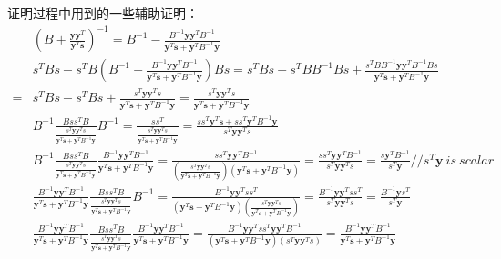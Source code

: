 证明过程中用到的一些辅助证明：
\begin{displaymath}
\begin{split}
&(B + \frac{\mathbf{y}\mathbf{y}^T}{\mathbf{y}^T\mathbf{s}})^{-1}
=B^{-1}-\frac{B^{-1}\mathbf{yy}^TB^{-1}}{\mathbf{y}^T\mathbf{s} + \mathbf{y}^TB^{-1}\mathbf{y}}\\
&s^TBs-s^TB (B^{-1}-\frac{B^{-1}\mathbf{yy}^TB^{-1}}{\mathbf{y}^T\mathbf{s} + \mathbf{y}^TB^{-1}\mathbf{y}}) Bs
=s^TBs-s^TBB^{-1}Bs+\frac{s^TBB^{-1}\mathbf{yy}^TB^{-1}Bs}{\mathbf{y}^T\mathbf{s} + \mathbf{y}^TB^{-1}\mathbf{y}}\\
=&s^TBs-s^TBs+\frac{s^T\mathbf{yy}^Ts}{\mathbf{y}^T\mathbf{s} + \mathbf{y}^TB^{-1}\mathbf{y}}
=\frac{s^T\mathbf{yy}^Ts}{\mathbf{y}^T\mathbf{s} + \mathbf{y}^TB^{-1}\mathbf{y}}\\
&B^{-1}\frac{Bss^TB}{\frac{s^T\mathbf{yy}^Ts}{\mathbf{y}^T\mathbf{s} + \mathbf{y}^TB^{-1}\mathbf{y}}}B^{-1}
=\frac{ss^T}{\frac{s^T\mathbf{yy}^Ts}{\mathbf{y}^T\mathbf{s} + \mathbf{y}^TB^{-1}\mathbf{y}}}
=\frac{ss^T\mathbf{y}^T\mathbf{s} + ss^T\mathbf{y}^TB^{-1}\mathbf{y}}{s^T\mathbf{yy}^Ts}
\\
&B^{-1}\frac{Bss^TB}{\frac{s^T\mathbf{yy}^Ts}{\mathbf{y}^T\mathbf{s} + \mathbf{y}^TB^{-1}\mathbf{y}}}
\frac{B^{-1}\mathbf{yy}^TB^{-1}}{\mathbf{y}^T\mathbf{s} + \mathbf{y}^TB^{-1}\mathbf{y}}
=\frac{ss^T\mathbf{yy}^TB^{-1}}
{(\frac{s^T\mathbf{yy}^Ts}{\mathbf{y}^T\mathbf{s} + \mathbf{y}^TB^{-1}\mathbf{y}})(\mathbf{y}^T\mathbf{s} + \mathbf{y}^TB^{-1}\mathbf{y})}
=\frac{ss^T\mathbf{yy}^TB^{-1}}{s^T\mathbf{yy}^Ts}
=\frac{s\mathbf{y}^TB^{-1}}{s^T\mathbf{y}}//s^T\mathbf{y}~is~scalar
\\
&\frac{B^{-1}\mathbf{yy}^TB^{-1}}{\mathbf{y}^T\mathbf{s} + \mathbf{y}^TB^{-1}\mathbf{y}}
\frac{Bss^TB}{\frac{s^T\mathbf{yy}^Ts}{\mathbf{y}^T\mathbf{s} + \mathbf{y}^TB^{-1}\mathbf{y}}}
B^{-1}
=\frac{B^{-1}\mathbf{yy}^Tss^T}
{(\mathbf{y}^T\mathbf{s} + \mathbf{y}^TB^{-1}\mathbf{y})(\frac{s^T\mathbf{yy}^Ts}{\mathbf{y}^T\mathbf{s} + \mathbf{y}^TB^{-1}\mathbf{y}})}
=\frac{B^{-1}\mathbf{yy}^Tss^T}{s^T\mathbf{yy}^Ts}
=\frac{B^{-1}\mathbf{y}s^T}{s^T\mathbf{y}}
\\
&\frac{B^{-1}\mathbf{yy}^TB^{-1}}{\mathbf{y}^T\mathbf{s} + \mathbf{y}^TB^{-1}\mathbf{y}}
\frac{Bss^TB}{\frac{s^T\mathbf{yy}^Ts}{\mathbf{y}^T\mathbf{s} + \mathbf{y}^TB^{-1}\mathbf{y}}}
\frac{B^{-1}\mathbf{yy}^TB^{-1}}{\mathbf{y}^T\mathbf{s} + \mathbf{y}^TB^{-1}\mathbf{y}}
=\frac{B^{-1}\mathbf{yy}^Tss^T\mathbf{yy}^TB^{-1}}{(\mathbf{y}^T\mathbf{s} + \mathbf{y}^TB^{-1}\mathbf{y})(s^T\mathbf{yy}^Ts)}
=\frac{B^{-1}\mathbf{y}\mathbf{y}^TB^{-1}}{\mathbf{y}^T\mathbf{s} + \mathbf{y}^TB^{-1}\mathbf{y}}
\\
\end{split}
\end{displaymath}

